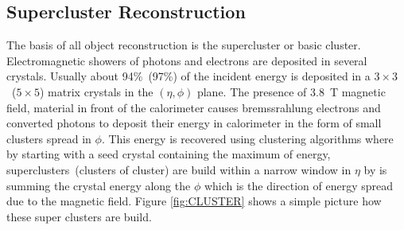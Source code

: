 \subsection{Supercluster Reconstruction}
The basis of all object reconstruction is the supercluster or basic cluster. Electromagnetic showers of photons and electrons are deposited in several crystals. Usually about 94\%~(97\%) of the incident energy is deposited in a $3\times3$~($5\times5$) matrix crystals in the $(\eta, \phi)$ plane. The presence of $3.8$~T magnetic field, material in front of the calorimeter causes bremssrahlung electrons and converted photons to deposit their energy in calorimeter in the form of small clusters spread in $\phi$.  This energy is recovered using clustering algorithms  where by starting with a seed crystal containing the maximum  of energy, superclusters~(clusters of cluster) are build within a narrow window in $\eta$ by is summing  the crystal energy along the $\phi$ which is the direction of energy spread due to the magnetic field. Figure \ref{fig:CLUSTER} shows a simple picture how these super clusters are build.
